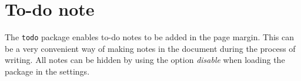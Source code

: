 \section{To-do note}
The \texttt{todo} package enables to-do notes to be added in the page margin. This can be a very convenient way of making notes in the document during the process of writing. All notes can be hidden by using the option \emph{disable} when loading the package in the settings. 
